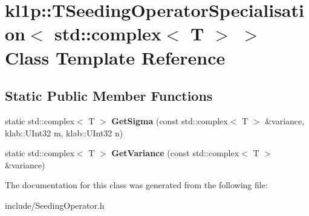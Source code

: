 \hypertarget{classkl1p_1_1TSeedingOperatorSpecialisation_3_01std_1_1complex_3_01T_01_4_01_4}{}\section{kl1p\+:\+:T\+Seeding\+Operator\+Specialisation$<$ std\+:\+:complex$<$ T $>$ $>$ Class Template Reference}
\label{classkl1p_1_1TSeedingOperatorSpecialisation_3_01std_1_1complex_3_01T_01_4_01_4}
\subsection*{Static Public Member Functions}
\begin{DoxyCompactItemize}
\item 
static std\+::complex$<$ T $>$ {\bfseries Get\+Sigma} (const std\+::complex$<$ T $>$ \&variance, klab\+::\+U\+Int32 m, klab\+::\+U\+Int32 n)\hypertarget{classkl1p_1_1TSeedingOperatorSpecialisation_3_01std_1_1complex_3_01T_01_4_01_4_a45a9ae86ee282306e2f49d32a091bd24}{}\label{classkl1p_1_1TSeedingOperatorSpecialisation_3_01std_1_1complex_3_01T_01_4_01_4_a45a9ae86ee282306e2f49d32a091bd24}

\item 
static std\+::complex$<$ T $>$ {\bfseries Get\+Variance} (const std\+::complex$<$ T $>$ \&variance)\hypertarget{classkl1p_1_1TSeedingOperatorSpecialisation_3_01std_1_1complex_3_01T_01_4_01_4_af9f3efcb7c504daea6f917124bc8fe12}{}\label{classkl1p_1_1TSeedingOperatorSpecialisation_3_01std_1_1complex_3_01T_01_4_01_4_af9f3efcb7c504daea6f917124bc8fe12}

\end{DoxyCompactItemize}


The documentation for this class was generated from the following file\+:\begin{DoxyCompactItemize}
\item 
include/Seeding\+Operator.\+h\end{DoxyCompactItemize}
